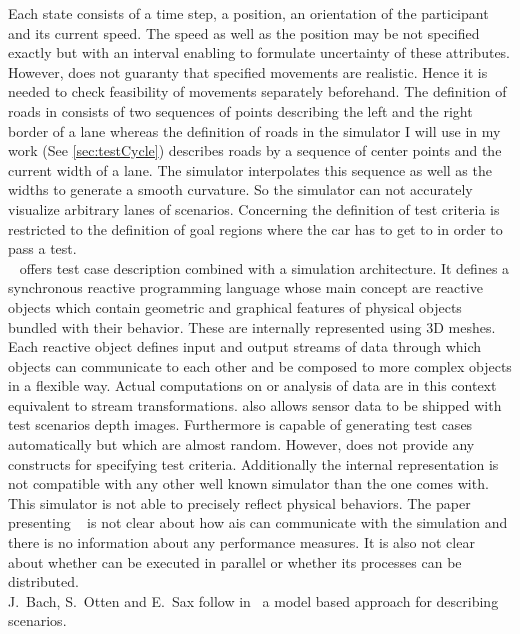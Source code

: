 Each state consists of a time step, a position, an orientation of the participant and its current speed.
The speed as well as the position may be not specified exactly but with an interval enabling to formulate uncertainty of these attributes.
However, \commonroad{} does not guaranty that specified movements are realistic.
Hence it is needed to check feasibility of movements separately beforehand.
The definition of roads in \commonroad{} consists of two sequences of points describing the left and the right border of a lane whereas the definition of roads in the simulator I will use in my work (See \autoref{sec:testCycle}) describes roads by a sequence of center points and the current width of a lane.
The simulator interpolates this sequence as well as the widths to generate a smooth curvature.
So the simulator can not accurately visualize arbitrary lanes of \commonroad{} scenarios.
Concerning the definition of test criteria \commonroad{} is restricted to the definition of goal regions where the car has to get to in order to pass a test.\\
\paracosm{}~\cite{paracosm} offers test case description combined with a simulation architecture.
It defines a synchronous reactive programming language whose main concept are reactive objects which contain geometric and graphical features of physical objects bundled with their behavior.
These are internally represented using 3D meshes.
Each reactive object defines input and output streams of data through which objects can communicate to each other and be composed to more complex objects in a flexible way.
Actual computations on or analysis of data are in this context equivalent to stream transformations.
\paracosm{} also allows sensor data to be shipped with test scenarios \eg{} depth images.
Furthermore \paracosm{} is capable of generating test cases automatically but which are almost random.
However, \paracosm{} does not provide any constructs for specifying test criteria.
Additionally the internal representation is not compatible with any other well known simulator than the one \paracosm{} comes with.
This simulator is not able to precisely reflect physical behaviors.
The paper presenting \paracosm{}~\cite{paracosm} is not clear about how \glspl{ai} can communicate with the simulation and there is no information about any performance measures. It is also not clear about whether \paracosm{} can be executed in parallel or whether its processes can be distributed.\\
J.\ Bach, S.\ Otten and E.\ Sax follow in~\cite{modelBasedDescription} a model based approach for describing scenarios.
